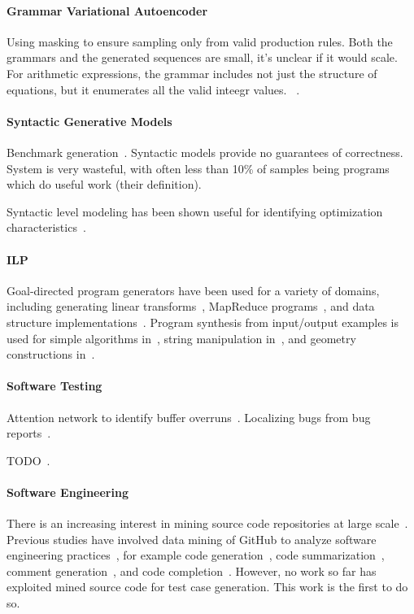 \paragraph{Grammar Variational Autoencoder} Using masking to ensure sampling only from valid production rules. Both the grammars and the generated sequences are small, it's unclear if it would scale. For arithmetic expressions, the grammar includes not just the structure of equations, but it enumerates all the valid inteegr values. ~\cite{Kusner2017}.

\paragraph{Syntactic Generative Models} Benchmark generation~\cite{Cummins2017a}. Syntactic models provide no guarantees of correctness. System is very wasteful, with often less than 10\% of samples being programs which do useful work (their definition).

Syntactic level modeling has been shown useful for identifying optimization characteristics~\cite{Cummins2017b}.

\paragraph{ILP} Goal-directed program generators have been used for a variety of domains, including generating linear transforms~\cite{Voronenko2009}, MapReduce programs~\cite{Smith}, and data structure implementations~\cite{Loncaric2016}. Program synthesis from input/output examples is used for simple algorithms in~\cite{Zaremba2015a}, string manipulation in~\cite{Gulwani2011}, and geometry constructions in~\cite{Gulwani2012}.

\paragraph{Software Testing} Attention network to identify buffer overruns~\cite{Choi2016}. Localizing bugs from bug reports~\cite{Lam2016,Huo2016}.

TODO~\cite{White2016}.

\paragraph{Software Engineering} There is an increasing interest in mining source code repositories at large scale~\cite{Allamanis2013a,White2015a,Bird2009}. Previous studies have involved data mining of GitHub to analyze software engineering practices~\cite{Wu2014,Guzman2014,Baishakhi2014a,Vasilescu2015}, for example code generation~\cite{Zhang2015a}, code summarization~\cite{Allamanis2016}, comment generation~\cite{Wong2013}, and code completion~\cite{Raychev2014}. However, no work so far has exploited mined source code for test case generation. This work is the first to do so.